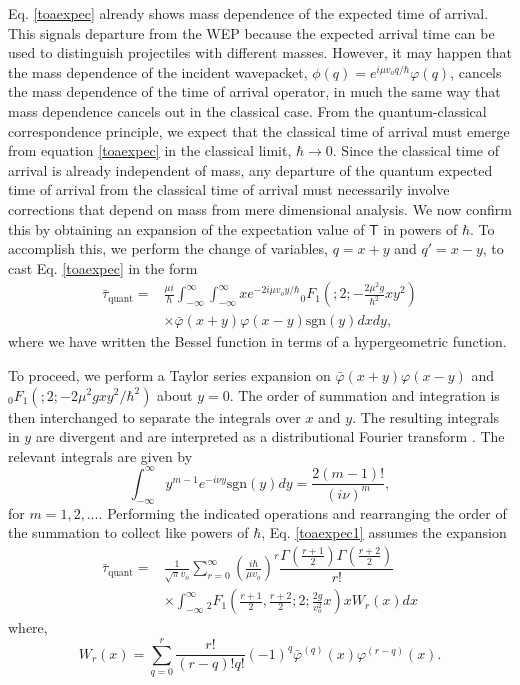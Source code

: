 \documentclass[%
 reprint,
 amsmath,amssymb,
 aps,
]{revtex4-1}
\newcommand{\opr}[1]{\ensuremath{\mathbf{\mathsf{#1}}}}
\begin{document}
Eq. \eqref{toaexpec} already shows mass dependence of the expected time of arrival. This signals departure from the WEP because the expected arrival time can be used to distinguish projectiles with different masses. However, it may happen that the mass dependence of the incident wavepacket, $\phi(q)=e^{i\mu v_o q/\hbar}\varphi(q)$, cancels the mass dependence of the time of arrival operator, in much the same way that mass dependence cancels out in the classical case. From the quantum-classical correspondence principle, we expect that the classical time of arrival must emerge from equation \eqref{toaexpec} in the classical limit, $\hbar\rightarrow 0$. Since the classical time of arrival is already independent of mass, any departure of the quantum expected time of arrival from the classical time of arrival must necessarily involve corrections that depend on mass from mere dimensional analysis. We now confirm this by obtaining an expansion of the expectation value of $\opr{T}$ in powers of $\hbar$. To accomplish this, we perform the change of variables, $q=x+y$ and $q'=x-y$, to cast Eq. \eqref{toaexpec} in the form
\begin{align}
\bar{\tau}_{\text{quant}} =& \frac{\mu i}{\hbar} \int_{-\infty}^{\infty}\int_{-\infty}^{\infty} xe^{-2i\mu v_o y/ \hbar} {_0 F_1}\left(;2;-\frac{2 \mu^2 g}{\hbar^2}xy^2\right) \nonumber \\
&\times \bar{\varphi}(x+y)\varphi(x-y)\text{sgn}(y)dx dy,
\label{toaexpec1}
\end{align}
where we have written the Bessel function in terms of a hypergeometric function. 

To proceed, we perform a Taylor series expansion on $\bar{\varphi}(x + y)\varphi(x-y)$ and ${_0 F_1}(;2;-2 \mu^2 gxy^2/\hbar^2)$ about $y=0$. The order of summation and integration is then interchanged to separate the integrals over $x$ and $y$. The resulting integrals in $y$ are divergent and are interpreted as a  distributional Fourier transform \cite{table}. The relevant integrals are given by
\begin{equation*}
\int_{-\infty}^{\infty}y^{m-1}e^{-i \nu y}\text{sgn}(y)dy=\dfrac{2(m-1)!}{(i\nu)^m},
\end{equation*}
for $m=1, 2,\dots$. Performing the indicated operations and rearranging the order of the summation to collect like powers of $\hbar$, Eq. \eqref{toaexpec1} assumes the expansion
\begin{align}
\bar{\tau}_{\text{quant}}=& \frac{1}{\sqrt{\pi}v_o} \sum_{r=0}^{\infty}\left(\frac{i \hbar}{\mu v_o}\right)^r \dfrac{\Gamma(\frac{r+1}{2})\Gamma(\frac{r+2}{2})}{r!} \nonumber \\
& \times \int_{-\infty}^{\infty} {_2 F_1}\left(\frac{r+1}{2},\frac{r+2}{2};2;\frac{2g}{v_o^2}x\right) x W_r(x) dx
\label{toaexpecfinal}
\end{align}
where, 
\begin{equation}
W_r(x) = \sum_{q=0}^r \dfrac{r!}{(r-q)!q!} (-1)^q \bar{\varphi}^{(q)}(x)\varphi^{(r-q)}(x).
\label{quantcorr}
\end{equation}
\end{document}
